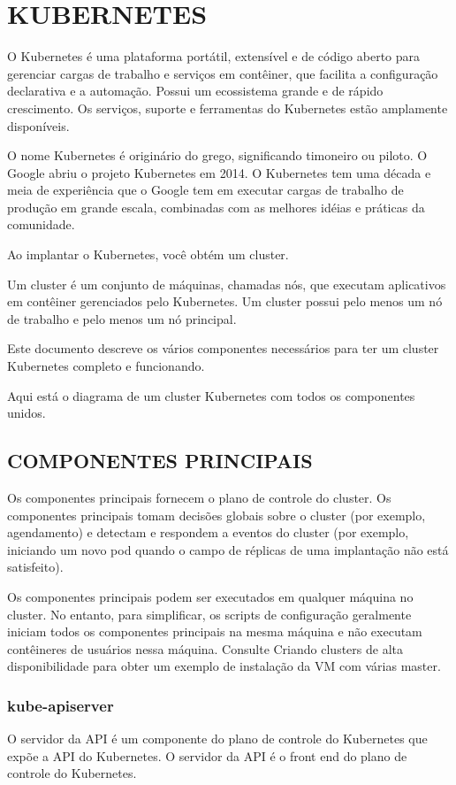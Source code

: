 \chapter{KUBERNETES}
\label{chap:kubernetes}

O Kubernetes é uma plataforma portátil, extensível e de código aberto para gerenciar cargas de trabalho e serviços em contêiner, que facilita a configuração declarativa e a automação. Possui um ecossistema grande e de rápido crescimento. Os serviços, suporte e ferramentas do Kubernetes estão amplamente disponíveis.

O nome Kubernetes é originário do grego, significando timoneiro ou piloto. O Google abriu o projeto Kubernetes em 2014. O Kubernetes tem uma década e meia de experiência que o Google tem em executar cargas de trabalho de produção em grande escala, combinadas com as melhores idéias e práticas da comunidade.

Ao implantar o Kubernetes, você obtém um cluster.

Um cluster é um conjunto de máquinas, chamadas nós, que executam aplicativos em contêiner gerenciados pelo Kubernetes. Um cluster possui pelo menos um nó de trabalho e pelo menos um nó principal.



Este documento descreve os vários componentes necessários para ter um cluster Kubernetes completo e funcionando.

Aqui está o diagrama de um cluster Kubernetes com todos os componentes unidos.

\section{COMPONENTES PRINCIPAIS}

Os componentes principais fornecem o plano de controle do cluster. Os componentes principais tomam decisões globais sobre o cluster (por exemplo, agendamento) e detectam e respondem a eventos do cluster (por exemplo, iniciando um novo pod quando o campo de réplicas de uma implantação não está satisfeito).

Os componentes principais podem ser executados em qualquer máquina no cluster. No entanto, para simplificar, os scripts de configuração geralmente iniciam todos os componentes principais na mesma máquina e não executam contêineres de usuários nessa máquina. Consulte Criando clusters de alta disponibilidade para obter um exemplo de instalação da VM com várias master.

\subsection{kube-apiserver}
O servidor da API é um componente do plano de controle do Kubernetes que expõe a API do Kubernetes. O servidor da API é o front end do plano de controle do Kubernetes.

